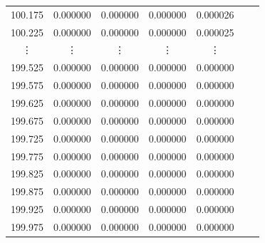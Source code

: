 \documentclass[a4j, titlepage]{jsarticle}
\numberwithin{equation}{section}
\begin{document}
\begin{table}[h]
\begin{tabular}{ccccccc}
                    100.175 & 0.000000 & 0.000000 & 0.000000 & 0.000026 \\
                    100.225 & 0.000000 & 0.000000 & 0.000000 & 0.000025 \\
                    \vdots & \vdots & \vdots & \vdots & \vdots \vspace{1mm} \\
                    199.525 & 0.000000 & 0.000000 & 0.000000 & 0.000000 \\
                    199.575 & 0.000000 & 0.000000 & 0.000000 & 0.000000 \\
                    199.625 & 0.000000 & 0.000000 & 0.000000 & 0.000000 \\
                    199.675 & 0.000000 & 0.000000 & 0.000000 & 0.000000 \\
                    199.725 & 0.000000 & 0.000000 & 0.000000 & 0.000000 \\
                    199.775 & 0.000000 & 0.000000 & 0.000000 & 0.000000 \\
                    199.825 & 0.000000 & 0.000000 & 0.000000 & 0.000000 \\
                    199.875 & 0.000000 & 0.000000 & 0.000000 & 0.000000 \\
                    199.925 & 0.000000 & 0.000000 & 0.000000 & 0.000000 \\
                    199.975 & 0.000000 & 0.000000 & 0.000000 & 0.000000 \\
                    \hline																	
                \end{tabular}
            \end{table}
\end{document}
